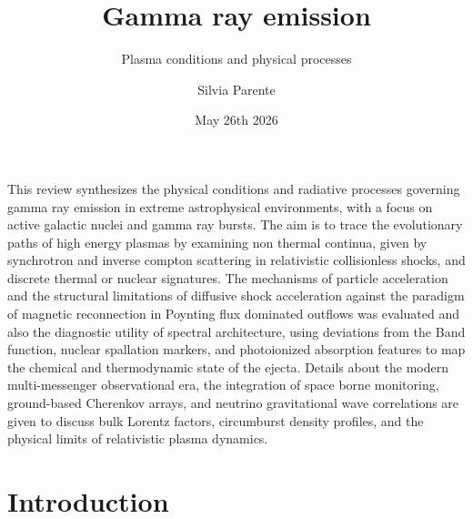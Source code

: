 \documentclass{aa} %
\begin{document}
  \title{Gamma ray emission}
  \subtitle{Plasma conditions and physical processes}

  \author{Silvia Parente
    }


  \date{May 26th 2026}


 \abstract
 {
This review synthesizes the physical conditions and radiative processes governing gamma ray emission in extreme astrophysical environments, with a focus on active galactic nuclei and gamma ray bursts. The aim is to trace the evolutionary paths of high energy plasmas by examining non thermal continua, given by synchrotron and inverse compton scattering in relativistic collisionless shocks, and discrete thermal or nuclear signatures. The mechanisms of particle acceleration and the structural limitations of diffusive shock acceleration against the paradigm of magnetic reconnection in Poynting flux dominated outflows was evaluated and also the diagnostic utility of spectral architecture, using deviations from the Band function, nuclear spallation markers, and photoionized absorption features to map the chemical and thermodynamic state of the ejecta. Details about the modern multi-messenger observational era, the integration of space borne monitoring, ground-based Cherenkov arrays, and neutrino gravitational wave correlations are given to discuss bulk Lorentz factors, circumburst density profiles, and the physical limits of relativistic plasma dynamics.
}


\maketitle

\section{Introduction}
\end{document}
